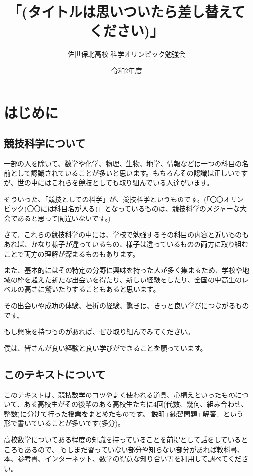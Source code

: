 \documentclass[uplatex,fleqn]{jsbook}
\begin{document}
\title{\HUGE 「(タイトルは思いついたら差し替えてください)」}
\author{\LARGE 佐世保北高校 科学オリンピック勉強会}
\date{令和2年度}
\maketitle

\chapter{はじめに}
\section{競技科学について}
一部の人を除いて、数学や化学、物理、生物、地学、情報などは一つの科目の名前として認識されていることが多いと思います。もちろんその認識は正しいですが、世の中にはこれらを競技としても取り組んでいる人達がいます。

そういった、「競技としての科学」が、競技科学というものです。(「〇〇オリンピック(〇〇には科目名が入る)」となっているものは、競技科学のメジャーな大会であると思って間違いないです。)

さて、これらの競技科学の中には、学校で勉強するその科目の内容と近いものもあれば、かなり様子が違っているもの、様子は違っているものの両方に取り組むことで両方の理解が深まるものもあります。

また、基本的にはその特定の分野に興味を持った人が多く集まるため、学校や地域の枠を超えた新たな出会いを得たり、新しい経験をしたり、全国の中高生のレベルの高さに驚いたりすることもあると思います。

その出会いや成功の体験、挫折の経験、驚きは、きっと良い学びにつながるものです。

もし興味を持つものがあれば、ぜひ取り組んでみてください。

僕は、皆さんが良い経験と良い学びができることを願っています。

\section{このテキストについて}
このテキストは、競技数学のコツやよく使われる道具、心構えといったものについて、ある高校生がその後輩のある高校生たちに4回(代数、幾何、組み合わせ、整数)に分けて行った授業をまとめたものです。
説明+練習問題+解答、という形で書いていることが多いです(多分)。

高校数学についてある程度の知識を持っていることを前提として話をしているところもあるので、
もしまだ習っていない部分や知らない部分があれば教科書、本、参考書、インターネット、数学の得意な知り合い等を利用して調べてください。
\end{document}
